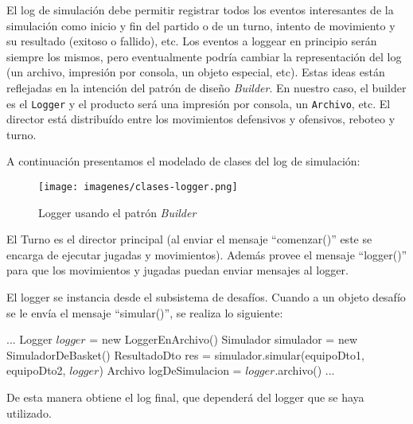 El log de simulación debe permitir registrar todos los eventos interesantes de la simulación como inicio y fin del partido o de un turno,
intento de movimiento y su resultado (exitoso o fallido), etc. Los eventos a loggear en principio serán siempre los mismos, pero eventualmente
podría cambiar la representación del log (un archivo, impresión por consola, un objeto especial, etc). Estas ideas están reflejadas en la
intención del patrón de diseño \emph{Builder}. En nuestro caso, el builder es el {\tt Logger} y el producto será una impresión por consola, un 
{\tt Archivo}, etc. El director está distribuído entre los movimientos defensivos y ofensivos, reboteo y turno.

A continuación presentamos el modelado de clases del log de simulación:

\begin{figure}[h!]
  \texttt{[image: imagenes/clases-logger.png]}
  \caption{Logger usando el patrón \emph{Builder}}
\end{figure}

El Turno es el director principal (al enviar el mensaje ``comenzar()'' este se encarga de ejecutar jugadas y movimientos). Adem\'as provee
el mensaje ``logger()'' para que los movimientos y jugadas puedan enviar mensajes al logger.

El logger se instancia desde el subsistema de desafíos. Cuando a un objeto desafío se le envía el mensaje ``simular()'', se realiza lo siguiente:


\begin{algorithmic} 
	\State ...
	\State Logger $logger$ = new LoggerEnArchivo()
	\State Simulador simulador = new SimuladorDeBasket()
	\State ResultadoDto res = simulador.simular(equipoDto1, equipoDto2, $logger$)
	\State Archivo logDeSimulacion = $logger$.archivo()
	\State ...
\end{algorithmic}

De esta manera obtiene el log final, que dependerá del logger que se haya utilizado.

